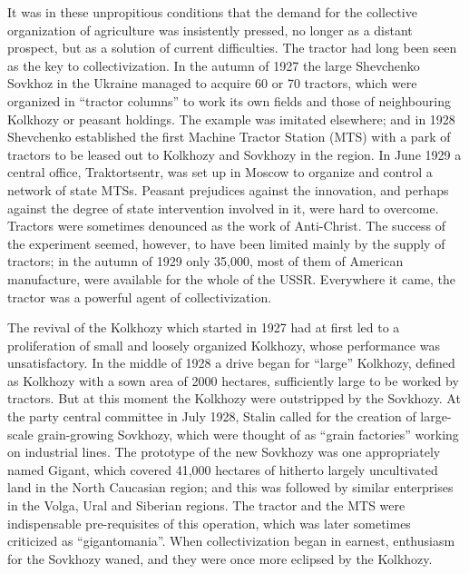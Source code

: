 It was in these unpropitious conditions that the demand for the collective organization of agriculture was insistently pressed, no longer as a distant prospect, but as a solution of current difficulties. The tractor had long been seen as the key to collectivization. In the autumn of 1927 the large Shevchenko Sovkhoz in the Ukraine managed to acquire 60 or 70 tractors, which were organized in ``tractor columns'' to work its own fields and those of neighbouring Kolkhozy or peasant holdings. The example was imitated elsewhere; and in 1928 Shevchenko established the first Machine Tractor Station (MTS) with a park of tractors to be leased out to Kolkhozy and Sovkhozy in the region. In June 1929 a central office, Traktortsentr, was set up in Moscow to organize and control a network of state MTSs. Peasant prejudices against the innovation, and perhaps against the degree of state intervention involved in it, were hard to overcome. Tractors were sometimes denounced as the work of Anti-Christ. The success of the experiment seemed, however, to have been limited mainly by the supply of tractors; in the autumn of 1929 only 35,000, most of them of American manufacture, were available for the whole of the USSR. Everywhere it came, the tractor was a powerful agent of collectivization. 

The revival of the Kolkhozy which started in 1927 had at first led to a proliferation of small and loosely organized Kolkhozy, whose performance was unsatisfactory. In the middle of 1928 a drive began for ``large'' Kolkhozy, defined as Kolkhozy with a sown area of 2000 hectares, sufficiently large to be worked by tractors. But at this moment the Kolkhozy were outstripped by the Sovkhozy. At the party central committee in July 1928, Stalin called for the creation of large-scale grain-growing Sovkhozy, which were thought of as ``grain factories'' working on industrial lines. The prototype of the new Sovkhozy was one appropriately named Gigant, which covered 41,000 hectares of hitherto largely uncultivated land in the North Caucasian region; and this was followed by similar enterprises in the Volga, Ural and Siberian regions. The tractor and the MTS were indispensable pre-requisites of this operation, which was later sometimes criticized as ``gigantomania''. When collectivization began in earnest, enthusiasm for the Sovkhozy waned, and they were once more eclipsed by the Kolkhozy. 

